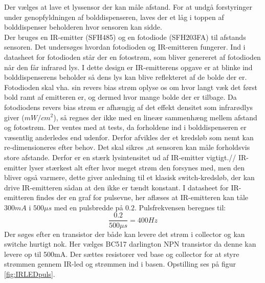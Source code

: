 \documentclass[HardwareDesign/HardwareDesign_main.tex]{subfiles}
\begin{document}
Der vælges at lave et lyssensor der kan måle afstand. For at undgå forstyringer under genopfyldningen af bolddispenseren, laves der et låg i toppen af bolddispenser beholderen hvor sensoren kan sidde.\\

Der bruges en IR-emitter (SFH485) og en fotodiode (SFH203FA) til afstands sensoren. Det undersøges hvordan fotodioden og IR-emitteren fungerer. Ind i datasheet for fotodioden står der en fotostrøm, som bliver genereret af fotodioden når den får infrarød lys. I dette design er IR-emitterens opgave er at blinke ind bolddispenserens beholder så dens lys kan blive reflekteret af de bolde der er. Fotodioden skal vha. sin revers bias strøm oplyse os om hvor langt væk det først bold ramt af emitteren er, og dermed hvor mange bolde der er tilbage. Da fotodiodens revers bias strøm er afhængig af det effekt densitet som infrarødlys giver ($mW/cm^2$), så regnes der ikke med en lineær sammenhæng mellem afstand og fotostrøm.
Der ventes med at tests, da forholdene ind i bolddispenseren er væsentlig anderledes end udenfor. Derfor afvikles der et kredsløb som nemt kan re-dimensioneres efter behov. Det skal sikres ,at sensoren kan måle forholdsvis store afstande. Derfor er en stærk lysintensitet ud af IR-emitter vigtigt.//
IR-emitter lyser stærkest alt efter hvor meget strøm den forsynes med, men den bliver også varmere, dette giver anledning til et klasisk switch-kredsløb, der kan drive IR-emitteren sådan at den ikke er tændt konstant. I datasheet for IR-emitteren findes der en graf for pulsevne, her aflæses at IR-emitteren kan tåle $300mA$ i $500\mu s$ med en pulsbredde på $0.2$. Pulsfrekvensen beregnes til:
\[\frac{0.2}{500\mu s}=400Hz\]
Der søges efter en transistor der både kan levere det strøm i collector og kan switche hurtigt nok. Her vælges BC517 darlington NPN transistor da denne kan levere op til 500mA. Der sættes resistorer ved base og collector for at styre strømmen gennem IR-led og strømmen ind i basen. Opstilling ses på figur \ref{fig:IRLEDpuls}.
\end{document}
